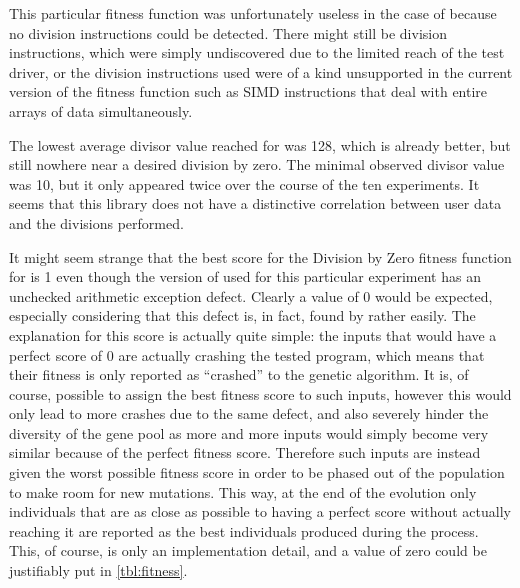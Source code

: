 This particular fitness function was unfortunately useless in the case of \libpcap because no division
instructions could be detected. There might still be division instructions, which were simply undiscovered due
to the limited reach of the test driver, or the division instructions used were of a kind unsupported in the
current version of the fitness function such as SIMD instructions that deal with entire arrays of data
simultaneously.

The lowest average divisor value reached for \libxml was 128, which is already better, but still nowhere near a
desired division by zero. The minimal observed divisor value was 10, but it only appeared twice over the
course of the ten experiments. It seems that this library does not have a distinctive correlation between user
data and the divisions performed.

It might seem strange that the best score for the Division by Zero fitness function for \libpng is 1 even
though the version of \libpng used for this particular experiment has an unchecked arithmetic exception
defect. Clearly a value of 0 would be expected, especially considering that this defect is, in
fact, found by \xmlmate rather easily. The explanation for this score is actually quite simple: the inputs
that would have a perfect score of 0 are actually crashing the tested program, which means that their
fitness is only reported as ``crashed'' to the genetic algorithm. It is, of course, possible to assign
the best fitness score to such inputs, however this would only lead to more crashes due to the same
defect, and also severely hinder the diversity of the gene pool as more and more inputs would simply become
very similar because of the perfect fitness score. Therefore such inputs are instead given the worst possible
fitness score in order to be phased out of the population to make room for new mutations. This way, at the end
of the evolution only individuals that are as close as possible to having a perfect score without actually
reaching it are reported as the best individuals produced during the process. This, of course, is only an
implementation detail, and a value of zero could be justifiably put in \cref{tbl:fitness}.


